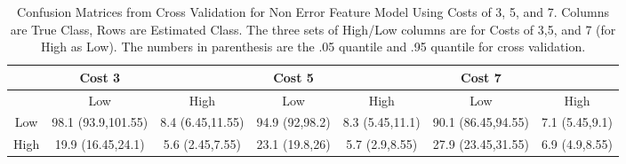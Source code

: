 \begin{table}[H]
\begin{center}
\begin{tabular}{c|cc|cc|cc|}
   & Cost 3 &  & Cost 5 &  & Cost 7 &  \\ 
   \hline
 & Low & High & Low & High & Low & High \\ 
   \hline
Low & 98.1 (93.9,101.55) & 8.4 (6.45,11.55) & 94.9 (92,98.2) & 8.3 (5.45,11.1) & 90.1 (86.45,94.55) & 7.1 (5.45,9.1) \\ 
  High & 19.9 (16.45,24.1) & 5.6 (2.45,7.55) & 23.1 (19.8,26) & 5.7 (2.9,8.55) & 27.9 (23.45,31.55) & 6.9 (4.9,8.55) \\ 
  \end{tabular}
\caption{Confusion Matrices from Cross Validation for Non Error Feature Model Using Costs of 3, 5, and 7. Columns are True Class, Rows are Estimated Class. The three sets of High/Low columns are for Costs of 3,5, and 7 (for High as Low). The numbers in parenthesis are the .05 quantile and .95 quantile for cross validation.}
\label{tab:confusionNonErrors}
\end{center}
\end{table}
